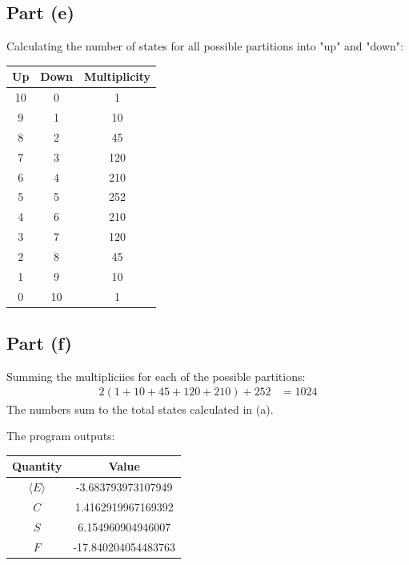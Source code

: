 \documentclass{article}
\begin{document}
\subsection*{Part (e)} Calculating the number of states for all possible partitions into "up" and "down":
\begin{center}
\begin{tabular}{|c|c|c|}
    \hline
    Up & Down & Multiplicity \\
    \hline
    10 & 0 & 1 \\
    \hline
    9 & 1 & 10 \\
    \hline
    8 & 2 & 45 \\
    \hline
    7 & 3 & 120 \\
    \hline
    6 & 4 & 210 \\
    \hline
    5 & 5 & 252 \\
    \hline
    4 & 6 & 210 \\
    \hline
    3 & 7 & 120 \\
    \hline
    2 & 8 & 45 \\
    \hline
    1 & 9 & 10 \\
    \hline
    0 & 10 & 1 \\
    \hline
\end{tabular}
\end{center}
\subsection*{Part (f)}
Summing the multipliciies for each of the possible partitions:
\begin{equation}
    \begin{split}
        2(1 + 10 + 45 + 120 + 210) + 252 & = 1024
    \end{split}
\end{equation}
The numbers sum to the total states calculated in (a).

\clearpage

\problem
The program outputs:
\begin{center}
    \begin{tabular}{|c|c|}
        \hline
        Quantity & Value \\
        \hline
        $\langle E \rangle$ & -3.683793973107949  \\
        \hline
        $C$ & 1.4162919967169392 \\
        \hline
        $S$ & 6.154960904946007 \\
        \hline
        $F$ & -17.840204054483763 \\
        \hline
    \end{tabular}
\end{center}
\end{document}
